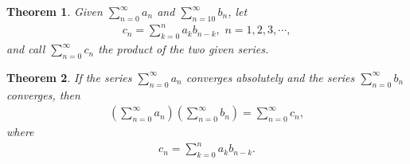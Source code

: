 \documentclass[11pt]{book}
\newtheorem{theorem}{Theorem}[chapter]
\theoremstyle{definition}
\numberwithin{equation}{chapter}
\begin{document}
\medskip

\begin{theorem}
Given $\sum^\infty_{n=0} a_n$ and $\sum^\infty_{n=10} b_n$, let
\begin{align*}
    c_n = \sum^n_{k=0} a_k b_{n-k}, \,\, n = 1,2,3,\cdots,
\end{align*}
and call $\sum^\infty_{n=0} c_n$ the product of the two given series.
\end{theorem}


\begin{theorem}
If the series $\sum^\infty_{n=0} a_n$ converges absolutely and the series $\sum^\infty_{n=0} b_n$ converges, then
\begin{align*}
    \left(\sum^\infty_{n=0} a_n\right) \left(\sum^\infty_{n=0} b_n\right) = \sum^\infty_{n=0} c_n,
\end{align*}
where 
\begin{align*}
    c_n = \sum^n_{k=0} a_k b_{n-k}.
\end{align*}
\end{theorem}
\end{document}
